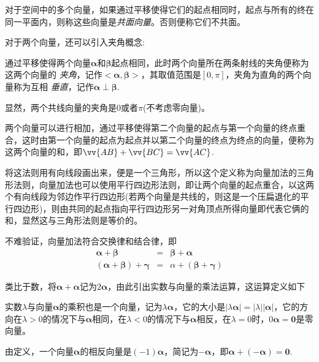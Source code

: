 \begin{definition}
  对于空间中的多个向量，如果通过平移使得它们的起点相同时，起点与所有的终在同一平面内，则称这些向量是\emph{共面向量}。否则便称它们不共面。
\end{definition}

对于两个向量，还可以引入夹角概念:
\begin{definition}
  通过平移使得两个向量$\bm{\alpha}$和$\bm{\beta}$起点相同，此时两个向量所在两条射线的夹角便称为这两个向量的 \emph{夹角}，记作$<\bm{\alpha},\bm{\beta}>$，其取值范围是$[0,\pi]$，夹角为直角的两个向量称为互相 \emph{垂直}，记作$\bm{\alpha} \perp \bm{\beta}$.
\end{definition}

显然，两个共线向量的夹角是0或者$\pi$(不考虑零向量)。

\begin{definition}
两个向量可以进行相加，通过平移使得第二个向量的起点与第一个向量的终点重合，这时由第一个向量的起点为起点并以第二个向量的终点为终点的向量，便称为这两个向量的和，即$\vv{AB}+\vv{BC}=\vv{AC}$.
\end{definition}

将这法则用有向线段画出来，便是一个三角形，所以这个定义称为向量加法的三角形法则，向量加法也可以使用平行四边形法则，即让两个向量的起点重合，以这两个有向线段为邻边作平行四边形(若两个向量是共线的，则这是一个压扁退化的平行四边形)，则由共同的起点指向平行四边形另一对角顶点所得向量即代表它俩的和，显然这与三角形法则是等价的。

不难验证，向量加法符合交换律和结合律，即
\begin{eqnarray*}
  \bm{\alpha} + \bm{\beta} & = & \bm{\beta}+\bm{\alpha} \\
  ( \bm{\alpha} + \bm{\beta} ) + \bm{\gamma} & = & \alpha + (\bm{\beta} + \bm{\gamma})
\end{eqnarray*}

类比于数，将$\bm{\alpha}+\bm{\alpha}$记为$2\bm{\alpha}$，由此引出实数与向量的乘法运算，这运算定义如下
\begin{definition}
  实数$\lambda$与向量$\bm{\alpha}$的乘积也是一个向量，记为$\lambda \bm{\alpha}$，它的大小是$|\lambda \bm{\alpha}| = |\lambda| |\bm{\alpha}|$，它的方向在$\lambda>0$的情况下与$\bm{\alpha}$相同，在$\lambda<0$的情况下与$\bm{\alpha}$相反，在$\lambda=0$时，$0\bm{\alpha} = \bm{0}$是零向量。
\end{definition}

由定义，一个向量$\bm{\alpha}$的相反向量是$(-1)\bm{\alpha}$，简记为$-\bm{\alpha}$，即$\bm{\alpha}+(-\bm{\alpha})=\bm{0}$.

